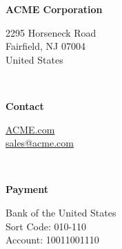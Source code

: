 \documentclass[
	a4paper, %
	9pt, %
]{CSMinimalInvoice}
\begin{document}

\vfill\vfill %




\begin{minipage}[t]{0.3\textwidth}
	\itshape %
	
	\textbf{ACME Corporation} %
	
	2295 Horseneck Road \\ %
	Fairfield, NJ 07004 \\
	United States \\
\end{minipage}
\begin{minipage}[t]{0.03\textwidth}
	~ %
\end{minipage} %
\begin{minipage}[t]{0.3\textwidth}
	\itshape %
	
	\textbf{Contact}
	
	\href{https://www.latextemplates.com}{ACME.com} \\ %
	\href{mailto:sales@acme.com}{sales@acme.com} \\
\end{minipage}
\begin{minipage}[t]{0.03\textwidth}
	~ %
\end{minipage}
\begin{minipage}[t]{0.3\textwidth}
	\itshape %
	
	\textbf{Payment}
	
	Bank of the United States \\ %
	Sort Code: 010-110 \\
	Account: 10011001110 \\
\end{minipage}
\end{document}
